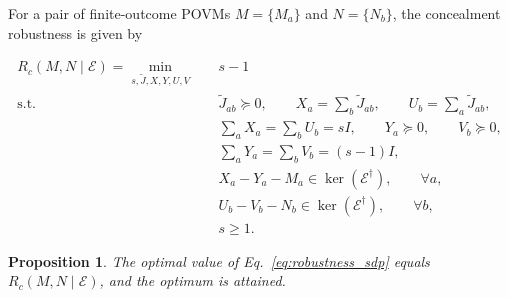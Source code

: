 \documentclass[
aps,pra,twocolumn,10pt,
superscriptaddress,longbibliography,floatfix
]{revtex4-2}
\newtheorem{proposition}[theorem]{Proposition}
\begin{document}
For a pair of finite-outcome POVMs $M=\{M_a\}$ and $N=\{N_b\}$, the concealment robustness is given by
\begin{widetext}
\begin{equation}
\label{eq:robustness_sdp}
\begin{aligned}
R_c(M,N\mid\mathcal E)
=\min_{s,\widetilde J,X,Y,U,V}\quad & s-1 \\[2pt]
\text{s.t.}\quad
& \widetilde J_{ab}\succeq0,
\qquad
  X_a=\sum_b\widetilde J_{ab},
\qquad
  U_b=\sum_a\widetilde J_{ab},\\
& \sum_aX_a=\sum_bU_b=sI,
\qquad
  Y_a\succeq0,
\qquad
  V_b\succeq0,\\
& \sum_aY_a=\sum_bV_b=(s-1)I,\\
& X_a-Y_a-M_a\in\ker(\mathcal E^\dagger),
\qquad \forall a,\\
& U_b-V_b-N_b\in\ker(\mathcal E^\dagger),
\qquad \forall b,\\
& s\ge1.
\end{aligned}
\end{equation}
\end{widetext}

\begin{proposition}
The optimal value of Eq.~\eqref{eq:robustness_sdp} equals $R_c(M,N\mid\mathcal E)$, and the optimum is attained.
\end{proposition}
\end{document}
